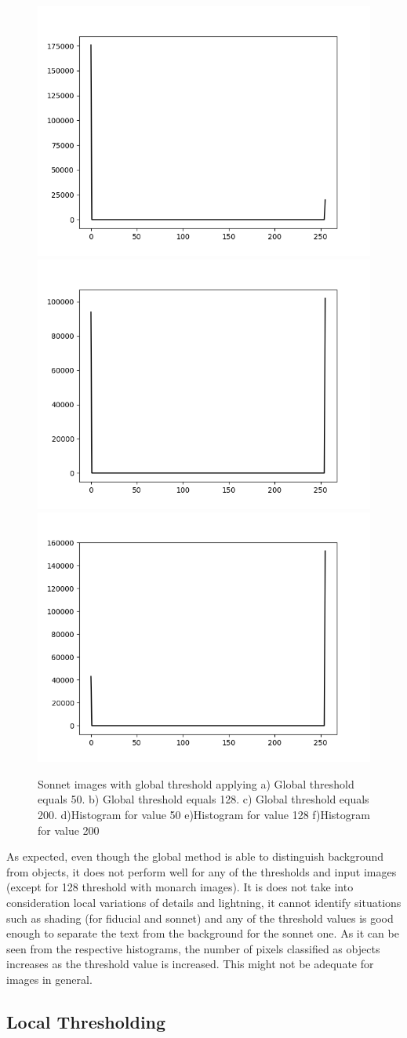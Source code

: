 \documentclass[]{IEEEtran}
\begin{document}
\begin{figure}[h]
  \includegraphics[width=0.3\hsize]{images/global-thresholding/50-threshold/sonnethistogram.png}
  \includegraphics[width=0.3\hsize]{images/global-thresholding/128-threshold/sonnethistogram.png}
  \includegraphics[width=0.3\hsize]{images/global-thresholding/200-threshold/sonnethistogram.png}
  \caption{Sonnet images with global threshold applying a) Global threshold equals 50. b) Global threshold equals 128. c) Global threshold equals 200. d)Histogram for value 50 e)Histogram for value 128 f)Histogram for value 200}
  \label{fig:global-sonnet}
\end{figure}

As expected, even though the global method is able to distinguish background from objects, it does not perform well for any of the thresholds and input images (except for 128 threshold with monarch images). It is does not take into consideration local variations of details and lightning, it cannot identify situations such as shading (for fiducial and sonnet) and any of the threshold values is good enough to separate the text from the background for the sonnet one. As it can be seen from the respective histograms, the number of pixels classified as objects increases as the threshold value is increased. This might not be adequate for images in general.

\subsection{Local Thresholding}
\end{document}
